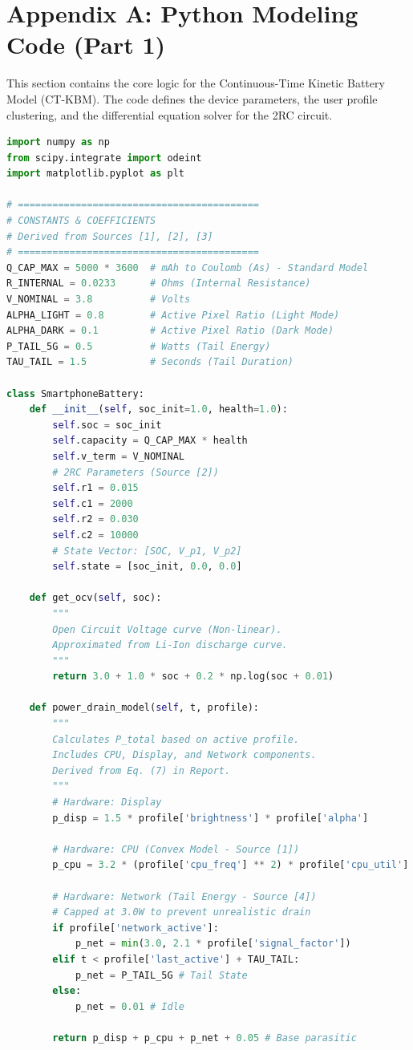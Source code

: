 \documentclass[12pt]{article}
\begin{document}
\newpage

\appendix
\section{Appendix A: Python Modeling Code (Part 1)}

This section contains the core logic for the Continuous-Time Kinetic Battery Model (CT-KBM). The code defines the device parameters, the user profile clustering, and the differential equation solver for the 2RC circuit.

\begin{lstlisting}[language=Python, caption=Core Battery Dynamics Class]
import numpy as np
from scipy.integrate import odeint
import matplotlib.pyplot as plt

# ==========================================
# CONSTANTS & COEFFICIENTS
# Derived from Sources [1], [2], [3]
# ==========================================
Q_CAP_MAX = 5000 * 3600  # mAh to Coulomb (As) - Standard Model
R_INTERNAL = 0.0233      # Ohms (Internal Resistance)
V_NOMINAL = 3.8          # Volts
ALPHA_LIGHT = 0.8        # Active Pixel Ratio (Light Mode)
ALPHA_DARK = 0.1         # Active Pixel Ratio (Dark Mode)
P_TAIL_5G = 0.5          # Watts (Tail Energy)
TAU_TAIL = 1.5           # Seconds (Tail Duration)

class SmartphoneBattery:
    def __init__(self, soc_init=1.0, health=1.0):
        self.soc = soc_init
        self.capacity = Q_CAP_MAX * health
        self.v_term = V_NOMINAL
        # 2RC Parameters (Source [2])
        self.r1 = 0.015
        self.c1 = 2000
        self.r2 = 0.030
        self.c2 = 10000
        # State Vector: [SOC, V_p1, V_p2]
        self.state = [soc_init, 0.0, 0.0]

    def get_ocv(self, soc):
        """
        Open Circuit Voltage curve (Non-linear).
        Approximated from Li-Ion discharge curve.
        """
        return 3.0 + 1.0 * soc + 0.2 * np.log(soc + 0.01)

    def power_drain_model(self, t, profile):
        """
        Calculates P_total based on active profile.
        Includes CPU, Display, and Network components.
        Derived from Eq. (7) in Report.
        """
        # Hardware: Display
        p_disp = 1.5 * profile['brightness'] * profile['alpha']
        
        # Hardware: CPU (Convex Model - Source [1])
        p_cpu = 3.2 * (profile['cpu_freq'] ** 2) * profile['cpu_util']
        
        # Hardware: Network (Tail Energy - Source [4])
        # Capped at 3.0W to prevent unrealistic drain
        if profile['network_active']:
            p_net = min(3.0, 2.1 * profile['signal_factor'])
        elif t < profile['last_active'] + TAU_TAIL:
            p_net = P_TAIL_5G # Tail State
        else:
            p_net = 0.01 # Idle
            
        return p_disp + p_cpu + p_net + 0.05 # Base parasitic
\end{lstlisting}
\end{document}
